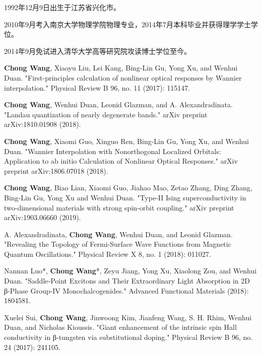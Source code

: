 \begin{resume}


  1992年12月9日出生于江苏省兴化市。

  2010年9月考入南京大学物理学院物理专业，2014年7月本科毕业并获得理学学士学位。

  2014年9月免试进入清华大学高等研究院攻读博士学位至今。


  \begin{publications}
    \item \textbf{Chong Wang}, Xiaoyu Liu, Lei Kang, Bing-Lin Gu, Yong Xu, and Wenhui Duan. "First-principles calculation of nonlinear optical responses by Wannier interpolation." Physical Review B 96, no. 11 (2017): 115147.

    \item \textbf{Chong Wang}, Wenhui Duan, Leonid Glazman, and A. Alexandradinata. "Landau quantization of nearly degenerate bands." arXiv preprint arXiv:1810.01908 (2018).

    \item \textbf{Chong Wang}, Xiaomi Guo, Xinguo Ren, Bing-Lin Gu, Yong Xu, and Wenhui Duan. "Wannier Interpolation with Nonorthogonal Localized Orbitals: Application to ab initio Calculation of Nonlinear Optical Responses." arXiv preprint arXiv:1806.07018 (2018).

    \item \textbf{Chong Wang}, Biao Lian, Xiaomi Guo, Jiahao Mao, Zetao Zhang, Ding Zhang, Bing-Lin Gu, Yong Xu and Wenhui Duan. "Type-II Ising superconductivity in two-dimensional materials with strong spin-orbit coupling." arXiv preprint arXiv:1903.06660 (2019).
 
    \item A. Alexandradinata, \textbf{Chong Wang}, Wenhui Duan, and Leonid Glazman. "Revealing the Topology of Fermi-Surface Wave Functions from Magnetic Quantum Oscillations." Physical Review X 8, no. 1 (2018): 011027.

    \item Nannan Luo*, \textbf{Chong Wang}*, Zeyu Jiang, Yong Xu, Xiaolong Zou, and Wenhui Duan. "Saddle‐Point Excitons and Their Extraordinary Light Absorption in 2D β‐Phase Group‐IV Monochalcogenides." Advanced Functional Materials (2018): 1804581.
    
    \item Xuelei Sui, \textbf{Chong Wang}, Jinwoong Kim, Jianfeng Wang, S. H. Rhim, Wenhui Duan, and Nicholas Kioussis. "Giant enhancement of the intrinsic spin Hall conductivity in β-tungsten via substitutional doping." Physical Review B 96, no. 24 (2017): 241105.
    

\end{publications}
\end{resume}
